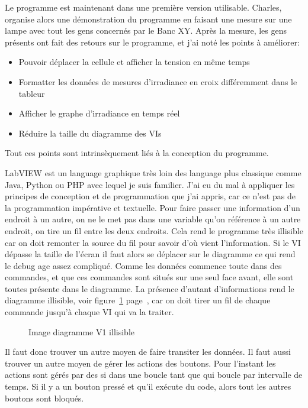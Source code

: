 \documentclass[12pt]{article}
\begin{document}
Le programme est maintenant dans une première version utilisable.  Charles, organise alors une démonstration du programme en faisant une mesure sur une lampe avec tout les gens concernés par le Banc XY.
Après la mesure, les gens présents ont fait des retours sur le programme, et j'ai noté les points à améliorer:
\begin{itemize}
	\item Pouvoir déplacer la cellule et afficher la tension en même temps
	\item Formatter les données de mesures d'irradiance en croix différemment dans le tableur
	\item Afficher le graphe d'irradiance en temps réel
	\item Réduire la taille du diagramme des VIs
\end{itemize}

Tout ces points sont intrinsèquement liés à la conception du programme.

LabVIEW est un language graphique très loin des language plus classique comme Java, Python ou PHP avec lequel je suis familier.
J'ai eu du mal à appliquer les principes de conception et de programmation que j'ai appris, car ce n'est pas de la programmation impérative et textuelle.
Pour faire passer une information d'un endroit à un autre, on ne le met pas dans une variable qu'on référence à un autre endroit, on tire un fil entre les deux endroits. 
Cela rend le programme très illisible car on doit remonter la source du fil pour savoir d'où vient l'information.
Si le VI dépasse la taille de l'écran il faut alors se déplacer sur le diagramme ce qui rend le debug age assez compliqué.
Comme les données commence toute dans des commandes, et que ces commandes sont situés sur une seul face avant, elle sont toutes présente dans le diagramme.
La présence d'autant d'informations rend le diagramme illisible, voir figure~\ref{fig:diagrammeV1} page~\pageref{fig:diagrammeV1}, car on doit tirer un fil de chaque commande jusqu'à chaque VI qui va la traiter.

\begin{figure}[p]
	\centering
	\caption{Image diagramme V1 illisible}
	\label{fig:diagrammeV1}
\end{figure}


Il faut donc trouver un autre moyen de faire transiter les données.
Il faut aussi trouver un autre moyen de gérer les actions des boutons.
Pour l'instant les actions sont gérés par des si dans une boucle tant que qui boucle par intervalle de temps. Si il y a un bouton pressé et qu'il exécute du code, alors tout les autres boutons sont bloqués.
\end{document}
